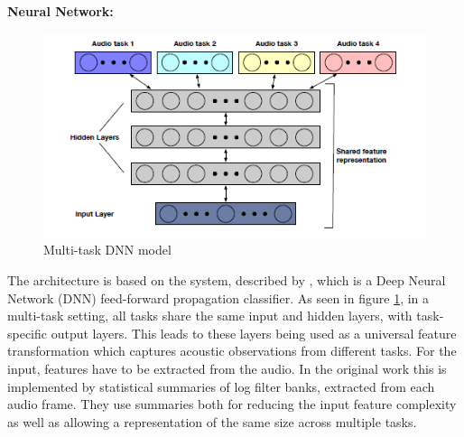
	
	
	\textbf{Neural Network:}\\
	
	\begin{figure}
		\centering
		\includegraphics[width=0.9\linewidth]{NN.PNG}
		\caption{Multi-task DNN model}
		\label{fig:NN}
	\end{figure}

	
	The architecture is based on the system, described by \citet{georgiev2017heterogeneous}, which is a Deep Neural Network (DNN) feed-forward propagation classifier. As seen in figure \ref{fig:NN}, in a multi-task setting, all tasks share the same input and hidden layers, with task-specific output layers. This leads to these layers being used as a universal feature transformation which captures acoustic observations from different tasks. For the input, features have to be extracted from the audio. In the original work this is implemented by statistical summaries of log filter banks, extracted from each audio frame. They use summaries both for reducing the input feature complexity as well as allowing a representation of the same size across multiple tasks. \\
	
